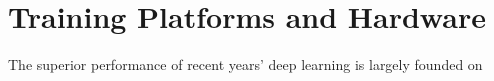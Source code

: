 \section{Training Platforms and Hardware}
The superior performance of recent years' deep learning is largely founded on 